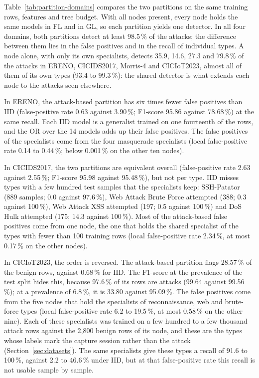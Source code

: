 
Table~\ref{tab:partition-domains} compares the two partitions on the same training rows, features and tree budget. With all nodes present, every node holds the same models in FL and in GL, so each partition yields one detector. In all four domains, both partitions detect at least 98.5\,\% of the attacks; the difference between them lies in the false positives and in the recall of individual types. A node alone, with only its own specialists, detects 35.9, 14.6, 27.3 and 79.8\,\% of the attacks in ERENO, CICIDS2017, Morris-4 and CICIoT2023, almost all of them of its own types (93.4 to 99.3\,\%): the shared detector is what extends each node to the attacks seen elsewhere.

In ERENO, the attack-based partition has six times fewer false positives than IID (false-positive rate 0.63 against 3.90\,\%; F1-score 95.86 against 78.68\,\%) at the same recall. Each IID model is a generalist trained on one fourteenth of the rows, and the OR over the 14 models adds up their false positives. The false positives of the specialists come from the four masquerade specialists (local false-positive rate 0.14 to 0.44\,\%; below 0.001\,\% on the other ten nodes).

In CICIDS2017, the two partitions are equivalent overall (false-positive rate 2.63 against 2.55\,\%; F1-score 95.98 against 95.48\,\%), but not per type. IID misses types with a few hundred test samples that the specialists keep: SSH-Patator (889 samples; 0.0 against 97.6\,\%), Web Attack Brute Force attempted (388; 0.3 against 100\,\%), Web Attack XSS attempted (197; 0.5 against 100\,\%) and DoS Hulk attempted (175; 14.3 against 100\,\%). Most of the attack-based false positives come from one node, the one that holds the shared specialist of the types with fewer than 100 training rows (local false-positive rate 2.34\,\%, at most 0.17\,\% on the other nodes).

In CICIoT2023, the order is reversed. The attack-based partition flags 28.57\,\% of the benign rows, against 0.68\,\% for IID. The F1-score at the prevalence of the test split hides this, because 97.6\,\% of its rows are attacks (99.64 against 99.56\,\%); at a prevalence of 6.8\,\%, it is 33.80 against 95.09\,\%. The false positives come from the five nodes that hold the specialists of reconnaissance, web and brute-force types (local false-positive rate 6.2 to 19.5\,\%, at most 0.58\,\% on the other nine). Each of these specialists was trained on a few hundred to a few thousand attack rows against the 2,800 benign rows of its node, and these are the types whose labels mark the capture session rather than the attack (Section~\ref{sec:datasets}). The same specialists give these types a recall of 91.6 to 100\,\%, against 2.2 to 46.6\,\% under IID, but at that false-positive rate this recall is not usable sample by sample.

